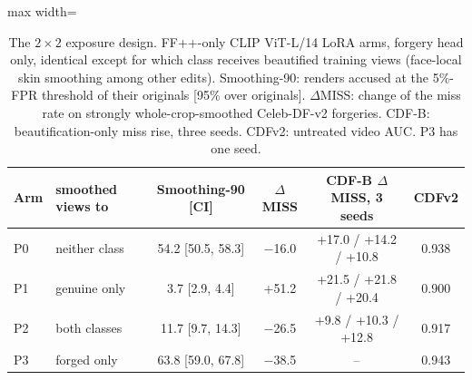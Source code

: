 \documentclass[conference]{IEEEtran}
\begin{document}
\begin{table}[t]
\centering
\caption{The $2\times2$ exposure design. FF++-only CLIP ViT-L/14 LoRA arms, forgery head only, identical except for which
class receives beautified training views (face-local skin smoothing among other edits). Smoothing-90: renders accused at the
5\%-FPR threshold of their originals [95\% over originals]. $\Delta$MISS: change of the miss rate on strongly
whole-crop-smoothed Celeb-DF-v2 forgeries. CDF-B: beautification-only miss rise, three seeds. CDFv2: untreated video AUC. P3
has one seed.}
\label{tab:exposure}
\scriptsize
\setlength{\tabcolsep}{3pt}
\begin{adjustbox}{max width=\columnwidth}
\begin{tabular}{@{}l l c c c c@{}}
\toprule
Arm & smoothed views to & Smoothing-90 [CI] & $\Delta$MISS & CDF-B $\Delta$MISS, 3 seeds & CDFv2 \\
\midrule
P0 & neither class & 54.2 [50.5, 58.3] & $-$16.0 & +17.0 / +14.2 / +10.8 & 0.938 \\
P1 & genuine only & 3.7 [2.9, 4.4] & +51.2 & +21.5 / +21.8 / +20.4 & 0.900 \\
P2 & both classes & 11.7 [9.7, 14.3] & $-$26.5 & +9.8 / +10.3 / +12.8 & 0.917 \\
P3 & forged only & 63.8 [59.0, 67.8] & $-$38.5 & -- & 0.943 \\
\bottomrule
\end{tabular}
\end{adjustbox}
\end{table}
\end{document}
